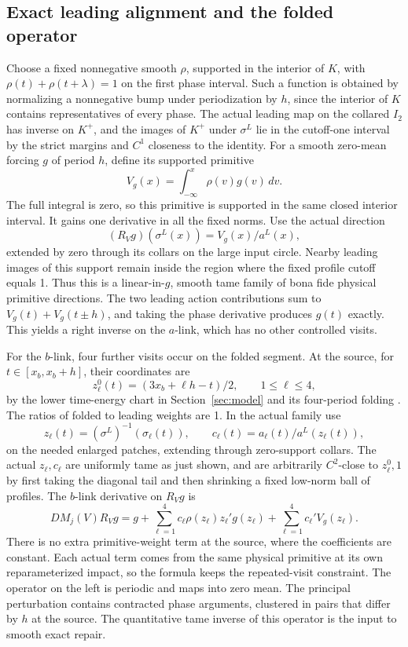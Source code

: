 \documentclass[11pt]{article}
\begin{document}
\subsection{Exact leading alignment and the folded
operator}\label{exact-leading-alignment-and-the-folded-operator}

Choose a fixed nonnegative smooth \(\rho\), supported in the interior
of \(K\), with \(\rho(t)+\rho(t+\lambda)=1\) on the first phase
interval. Such a function is obtained by normalizing a nonnegative
bump under periodization by \(h\), since the interior of \(K\)
contains representatives of every phase. The actual leading map on
the collared \(I_2\) has inverse on \(K^+\), and the images of \(K^+\)
under \(\sigma^L\) lie in the cutoff-one interval by the strict margins
and \(C^1\) closeness to the identity. For a smooth zero-mean forcing \(g\) of period \(h\), define its supported
primitive \[
 V_g(x)=\int_{-\infty}^{x}\rho(v)g(v)\,dv.
\] The full integral is zero, so this primitive is supported in the same closed
interior interval. It gains one derivative in all the fixed norms. Use the
actual direction \[
 (R_Vg)(\sigma^L(x))=V_g(x)/a^L(x),
\] extended by zero through its collars on the large input circle. Nearby
leading images of this support remain inside the region where the fixed profile
cutoff equals 1. Thus this is a linear-in-\(g\), smooth tame family of bona fide
physical primitive directions. The two leading action contributions sum to
\(V_g(t)+V_g(t\pm h)\), and taking the phase derivative produces \(g(t)\)
exactly. This yields a right inverse on the \(a\)-link, which has no other
controlled visits.

For the \(b\)-link, four further visits occur on the folded segment. At the
source, for \(t\in[x_b,x_b+h]\), their coordinates are \[
 z_\ell^0(t)=(3x_b+\ell h-t)/2,\qquad 1\le\ell\le4,
\] by the lower time-energy chart in Section~\ref{sec:model} and
its four-period folding \cite[Definition 4.4 and Lemma 4.5]{BT}. The ratios of
folded to leading weights are 1. In the actual family use \[
 z_\ell(t)=(\sigma^L)^{-1}(\sigma_\ell(t)),\qquad
 c_\ell(t)=a_\ell(t)/a^L(z_\ell(t)),
\] on the needed enlarged patches, extending through zero-support collars. The
actual \(z_\ell,c_\ell\) are uniformly tame as just shown, and are arbitrarily
\(C^2\)-close to \(z_\ell^0,1\) by first taking the diagonal tail and then
shrinking a fixed low-norm ball of profiles. The \(b\)-link derivative on
\(R_Vg\) is \[
 D M_j(V)R_Vg
 =g+\sum_{\ell=1}^4 c_\ell\rho(z_\ell)z_\ell' g(z_\ell)
     +\sum_{\ell=1}^4 c_\ell' V_g(z_\ell).
\] There is no extra primitive-weight term at the source, where the coefficients
are constant. Each actual term comes from the same physical primitive at its own
reparameterized impact, so the formula keeps the repeated-visit constraint. The
operator on the left is periodic and maps into zero mean. The principal
perturbation contains contracted phase arguments, clustered in pairs that differ
by \(h\) at the source. The quantitative tame inverse of this operator is the
input to smooth exact repair.
\end{document}
